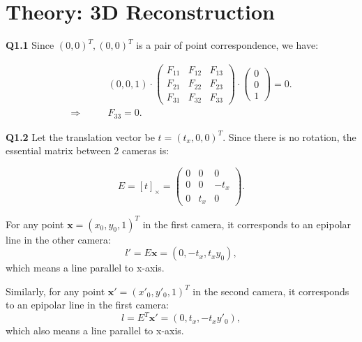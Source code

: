 \documentclass[
  course = {{16-720B Computer Vision}},
  quartile = {{1}},
  assignment = 5\ -\ 3D\ Reconstruction\ \&\ Photometric\ Stereo,
  name = {{Kangle Deng}},
  email = {{kangled@andrew.cmu.edu}},
  firstexercise = 1
]{aga-homework}
\begin{document}
\section{Theory: 3D Reconstruction}
\noindent\textbf{Q1.1} Since ${(0,0)^T,(0,0)^T}$ is a pair of point correspondence, we have:

\begin{equation*}
\begin{aligned}
    & (0,0,1) \cdot \left(\begin{array}{ccc}
       F_{11}  &  F_{12} & F_{13} \\
        F_{21} &  F_{22} & F_{23} \\
        F_{31} & F_{32} & F_{33}
    \end{array}
    \right) \cdot \left(
    \begin{array}{c}
         0 \\
         0 \\
         1
    \end{array}
    \right) = 0. \\
    \Rightarrow \qquad & F_{33} = 0.
\end{aligned}

\end{equation*}

\noindent\textbf{Q1.2} Let the translation vector be $t = (t_x, 0, 0)^T$. Since there is no rotation, the essential matrix between 2 cameras is:

\begin{equation*}
    E = [t]_\times = \left(\begin{array}{ccc}
       0  & 0 & 0 \\
       0  & 0 & -t_x \\
       0 & t_x & 0
    \end{array}\right).
\end{equation*}

For any point $\mathbf{x} = (x_0,y_0,1)^T$ in the first camera, it corresponds to an epipolar line in the other camera:
\begin{equation*}
    l' = E\mathbf{x} = (0,-t_x,t_xy_0),
\end{equation*}
which means a line parallel to x-axis.

Similarly, for any point $\mathbf{x'} = (x'_0,y'_0,1)^T$ in the second camera, it corresponds to an epipolar line in the first camera:
\begin{equation*}
    l = E^T\mathbf{x'} = (0,t_x,-t_xy'_0),
\end{equation*}
which also means a line parallel to x-axis.
\end{document}
